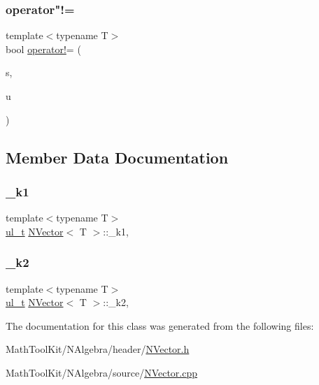 \subsubsection{\texorpdfstring{operator"!=}{operator!=}\hspace{0.1cm}{\footnotesize\ttfamily [3/3]}}
{\footnotesize\ttfamily template$<$typename T$>$ \\
bool \mbox{\hyperlink{class_n_vector_a697b7e9e059d8045dc5f682f94521548}{operator!}}= (\begin{DoxyParamCaption}\item[{T}]{s,  }\item[{const \mbox{\hyperlink{class_n_vector}{N\+Vector}}$<$ T $>$ \&}]{u }\end{DoxyParamCaption})\hspace{0.3cm}{\ttfamily [friend]}}



\subsection{Member Data Documentation}
\mbox{\label{class_n_vector_a355ee9ef9436669e52d0ff4538f85e27}} 
\subsubsection{\texorpdfstring{\_k1}{\_k1}}
{\footnotesize\ttfamily template$<$typename T$>$ \\
\mbox{\hyperlink{typedef_8h_a1b140a2034db3f5dfe18a987745df43a}{ul\+\_\+t}} \mbox{\hyperlink{class_n_vector}{N\+Vector}}$<$ T $>$\+::\+\_\+k1\hspace{0.3cm}{\ttfamily [mutable]}, {\ttfamily [protected]}}

\mbox{\label{class_n_vector_a6591512e0566996c42f3d74c8174385e}} 
\subsubsection{\texorpdfstring{\_k2}{\_k2}}
{\footnotesize\ttfamily template$<$typename T$>$ \\
\mbox{\hyperlink{typedef_8h_a1b140a2034db3f5dfe18a987745df43a}{ul\+\_\+t}} \mbox{\hyperlink{class_n_vector}{N\+Vector}}$<$ T $>$\+::\+\_\+k2\hspace{0.3cm}{\ttfamily [mutable]}, {\ttfamily [protected]}}



The documentation for this class was generated from the following files\+:\begin{DoxyCompactItemize}
\item 
Math\+Tool\+Kit/\+N\+Algebra/header/\mbox{\hyperlink{_n_vector_8h}{N\+Vector.\+h}}\item 
Math\+Tool\+Kit/\+N\+Algebra/source/\mbox{\hyperlink{_n_vector_8cpp}{N\+Vector.\+cpp}}\end{DoxyCompactItemize}
